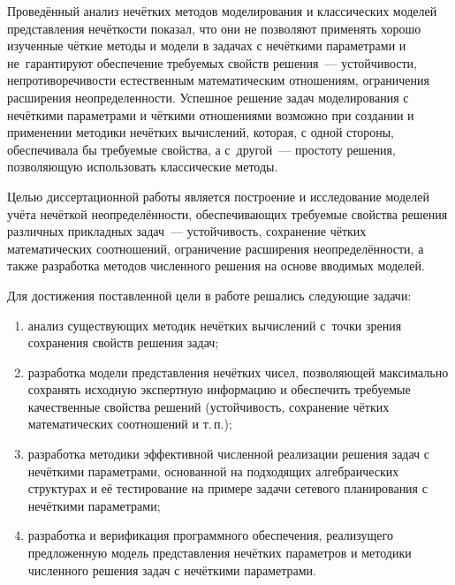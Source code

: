 Проведённый анализ нечётких методов моделирования и классических моделей представления нечёткости показал, что они не позволяют применять хорошо изученные чёткие методы и модели в задачах с нечёткими параметрами и не~гарантируют обеспечение требуемых свойств решения~--- устойчивости, непротиворечивости естественным математическим отношениям, ограничения расширения неопределенности. Успешное решение задач моделирования с нечёткими параметрами и чёткими отношениями возможно при создании и применении методики нечётких вычислений, которая, с одной стороны, обеспечивала бы требуемые свойства, а с~другой~--- простоту решения, позволяющую использовать классические методы.

Целью диссертационной работы является построение и исследование моделей учёта нечёткой неопределённости, обеспечивающих требуемые свойства решения различных прикладных задач~--- устойчивость, сохранение чётких математических соотношений, ограничение расширения неопределённости, а также разработка методов численного решения на основе вводимых моделей. 

Для достижения поставленной цели в работе решались следующие задачи:
\begin{enumerate}
  \item анализ существующих методик нечётких вычислений с~точки зрения сохранения свойств решения задач;
  \item разработка модели представления нечётких чисел, позволяющей максимально сохранять исходную экспертную информацию и обеспечить требуемые качественные свойства решений (устойчивость, сохранение чётких математических соотношений и т.\,п.);
  \item разработка методики эффективной численной реализации решения задач с нечёткими параметрами, основанной на подходящих алгебраических структурах и её тестирование на примере задачи сетевого планирования с нечёткими параметрами;
  \item разработка и верификация программного обеспечения, реализущего предложенную модель представления нечётких параметров и методики численного решения задач с нечёткими параметрами.
\end{enumerate}